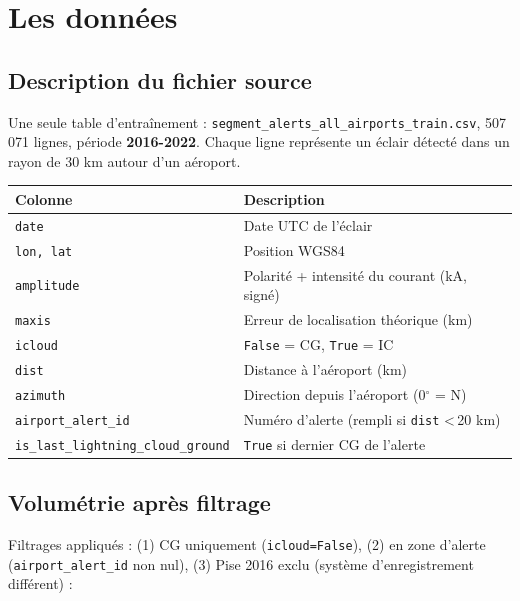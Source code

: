 \documentclass[11pt,a4paper]{article}
\begin{document}
\section{Les données}

\subsection{Description du fichier source}

Une seule table d'entraînement : \texttt{segment\_alerts\_all\_airports\_train.csv}, 507\,071
lignes, période \textbf{2016-2022}. Chaque ligne représente un éclair détecté dans un rayon
de 30 km autour d'un aéroport.

\begin{table}[H]
\centering
\small
\begin{tabular}{lp{9cm}}
\toprule
\textbf{Colonne} & \textbf{Description} \\
\midrule
\texttt{date}                  & Date UTC de l'éclair \\
\texttt{lon, lat}              & Position WGS84 \\
\texttt{amplitude}             & Polarité + intensité du courant (kA, signé) \\
\texttt{maxis}                 & Erreur de localisation théorique (km) \\
\texttt{icloud}                & \texttt{False} = CG, \texttt{True} = IC \\
\texttt{dist}                  & Distance à l'aéroport (km) \\
\texttt{azimuth}               & Direction depuis l'aéroport (0$^\circ$ = N) \\
\texttt{airport\_alert\_id}    & Numéro d'alerte (rempli si \texttt{dist} <\,20 km) \\
\texttt{is\_last\_lightning\_cloud\_ground} & \texttt{True} si dernier CG de l'alerte \\
\bottomrule
\end{tabular}
\end{table}

\subsection{Volumétrie après filtrage}

Filtrages appliqués : (1) CG uniquement (\texttt{icloud=False}), (2) en zone d'alerte
(\texttt{airport\_alert\_id} non nul), (3) Pise 2016 exclu (système d'enregistrement
différent) :
\end{document}
